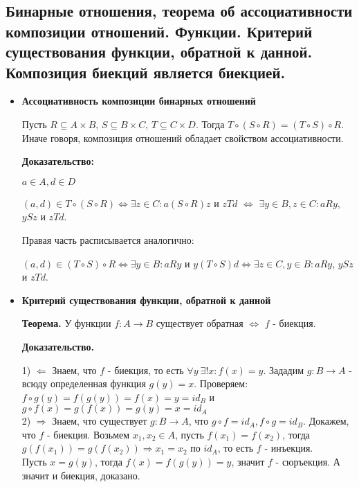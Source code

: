 \subsection{Бинарные отношения, теорема об ассоциативности композиции отношений. Функции. Критерий существования функции, обратной к данной. Композиция биекций является биекцией.}

\begin{itemize}
	\item \textbf{Ассоциативность композиции бинарных отношений}
	
	Пусть $R \subseteq A \times B$, $S \subseteq B \times C$, $T \subseteq C \times D$. Тогда $T \circ (S \circ R) = (T \circ S) \circ R$. Иначе говоря, композиция отношений обладает свойством ассоциативности.

	\textbf{Доказательство:}
	
	$a \in A, d \in D$
	
	$(a, d) \in T \circ (S \circ R) \Leftrightarrow \exists z \in C: a(S \circ R)z$ и $zTd$ $\Leftrightarrow$ $\exists y \in B, z \in C: aRy$, $ySz$ и $zTd$.
	
	Правая часть расписывается аналогично:
	
	$(a, d) \in (T \circ S) \circ R \Leftrightarrow \exists y \in B: aRy$ и $y(T \circ S)d \Leftrightarrow \exists z \in C, y \in B: aRy$, $ySz$ и $zTd$.
	
	\item \textbf{Критерий существования функции, обратной к данной}
	
	\textbf{Теорема.} У функции $f : A \to B$ существует обратная $\Leftrightarrow$ $f$ - биекция.
	
	\textbf{Доказательство.} 
	
	1) $\Leftarrow$ Знаем, что $f$ - биекция, то есть $\forall y\ \exists! x : f(x) = y$. Зададим $g : B \to A$ - всюду определенная функция $g(y) = x$. Проверяем: $f \circ g (y) = f (g(y)) = f(x) = y = id_B$ и $g \circ f(x) = g(f(x)) = g(y) = x = id_A$ \\
	
	2) $\Rightarrow$ Знаем, что существует $g : B \to A$, что $g \circ f = id_A, f \circ g = id_B$. Докажем, что $f$ - биекция. Возьмем $x_1, x_2 \in A$, пусть $f(x_1) = f(x_2)$, тогда $g(f(x_1))  = g(f(x_2)) \Rightarrow x_1 = x_2$ по $id_A$, то есть $f$ - инъекция. \\
	
	Пусть $x = g(y)$, тогда $f(x) = f(g(y)) = y$, значит $f$ - сюръекция. А значит и биекция, доказано.
	

\end{itemize}
